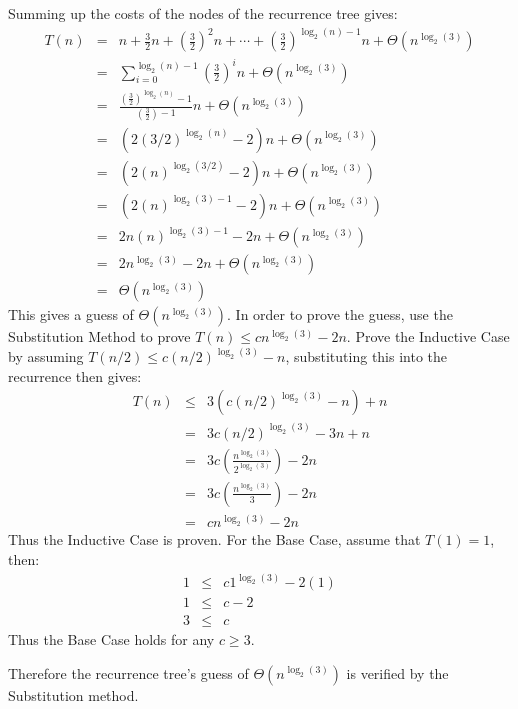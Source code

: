 Summing up the costs of the nodes of the recurrence tree gives:
\begin{eqnarray*}
	T(n) &=& n + \frac{3}{2}n + \left(\frac{3}{2}\right)^2n + \cdots + \left(\frac{3}{2}\right)^{\log_2(n) - 1}n + \Theta(n^{\log_2(3)}) \\
	&=& \sum_{i=0}^{\log_2(n)-1} \left(\frac{3}{2}\right)^in + \Theta(n^{\log_2(3)}) \\
	&=& \frac{\left(\frac{3}{2}\right)^{\log_2(n)} - 1}{\left(\frac{3}{2}\right) - 1}n + \Theta(n^{\log_2(3)}) \\
	&=& (2(3/2)^{\log_2(n)} - 2)n + \Theta(n^{\log_2(3)}) \\
	&=& (2(n)^{\log_2(3/2)} - 2)n + \Theta(n^{\log_2(3)}) \\
	&=& (2(n)^{\log_2(3) - 1} - 2)n + \Theta(n^{\log_2(3)}) \\
	&=& 2n(n)^{\log_2(3) - 1} - 2n + \Theta(n^{\log_2(3)}) \\
	&=& 2n^{\log_2(3)} - 2n + \Theta(n^{\log_2(3)}) \\
	&=& \Theta(n^{\log_2(3)})
\end{eqnarray*}
This gives a guess of $\Theta(n^{\log_2(3)})$.  In order to prove the guess, use the Substitution Method to prove $T(n) \leq cn^{\log_2(3)} - 2n$.  Prove the Inductive Case by assuming $T(n/2) \leq c(n/2)^{\log_2(3)} - n$, substituting this into the recurrence then gives:
\begin{eqnarray*}
	T(n) &\leq& 3(c(n/2)^{\log_2(3)} - n) + n \\
	&=& 3c(n/2)^{\log_2(3)} - 3n + n \\
	&=& 3c\left(\frac{n^{\log_2(3)}}{2^{\log_2(3)}}\right) - 2n \\
	&=& 3c\left(\frac{n^{\log_2(3)}}{3}\right) - 2n \\
	&=& cn^{\log_2(3)} - 2n
\end{eqnarray*}
Thus the Inductive Case is proven.  For the Base Case, assume that $T(1) = 1$, then:
\begin{eqnarray*}
	1 &\leq& c1^{\log_2(3)} - 2(1) \\
	1 &\leq& c - 2 \\
	3 &\leq& c
\end{eqnarray*}
Thus the Base Case holds for any $c \geq 3$.

Therefore the recurrence tree's guess of $\Theta(n^{\log_2(3)})$ is verified by the Substitution method.
